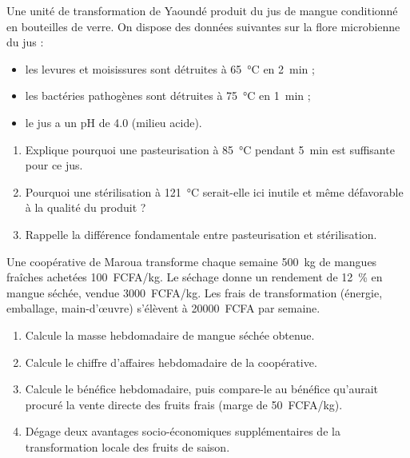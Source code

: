 \documentclass[11pt]{article}
\newcounter{popsec}
\newcounter{popsub}
\newcommand{\courssub}[1]{%
  \stepcounter{popsub}%
  \par\vspace{9pt}\noindent{\popxbold\fontsize{11.5}{13}\selectfont\color{popink}{\color{poporange}\thepopsec.\thepopsub}\hspace{6pt}#1}\par\nopagebreak\vspace{4pt}
}
\begin{document}
\begin{exercice}
Une unité de transformation de Yaoundé produit du jus de mangue conditionné en bouteilles de verre. On dispose des données suivantes sur la flore microbienne du jus :
\begin{itemize}
\item les levures et moisissures sont détruites à \SI{65}{\celsius} en \SI{2}{min} ;
\item les bactéries pathogènes sont détruites à \SI{75}{\celsius} en \SI{1}{min} ;
\item le jus a un pH de \num{4,0} (milieu acide).
\end{itemize}
\begin{enumerate}
\item Explique pourquoi une pasteurisation à \SI{85}{\celsius} pendant \SI{5}{min} est suffisante pour ce jus.
\item Pourquoi une stérilisation à \SI{121}{\celsius} serait-elle ici inutile et même défavorable à la qualité du produit ?
\item Rappelle la différence fondamentale entre pasteurisation et stérilisation.
\end{enumerate}
\end{exercice}

\begin{exercice}
Une coopérative de Maroua transforme chaque semaine \SI{500}{kg} de mangues fraîches achetées \SI{100}{FCFA/kg}. Le séchage donne un rendement de \SI{12}{\percent} en mangue séchée, vendue \SI{3000}{FCFA/kg}. Les frais de transformation (énergie, emballage, main-d'œuvre) s'élèvent à \SI{20000}{FCFA} par semaine.
\begin{enumerate}
\item Calcule la masse hebdomadaire de mangue séchée obtenue.
\item Calcule le chiffre d'affaires hebdomadaire de la coopérative.
\item Calcule le bénéfice hebdomadaire, puis compare-le au bénéfice qu'aurait procuré la vente directe des fruits frais (marge de \SI{50}{FCFA/kg}).
\item Dégage deux avantages socio-économiques supplémentaires de la transformation locale des fruits de saison.
\end{enumerate}
\end{exercice}

\courssub{Je me prépare au Bac}
\end{document}
